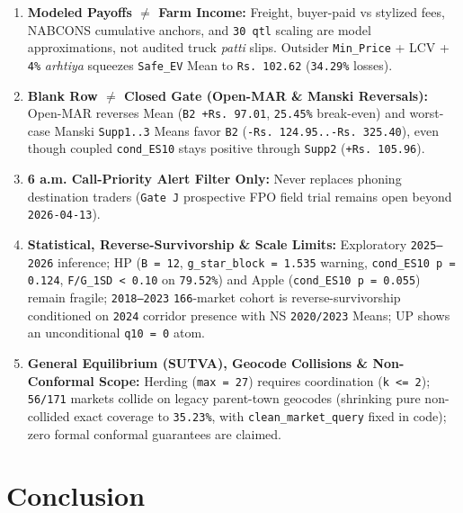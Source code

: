 \documentclass[11pt,a4paper]{article}
\begin{document}
\begin{enumerate}
  \item \textbf{Modeled Payoffs $\ne$ Farm Income:} Freight, buyer-paid vs stylized fees, NABCONS cumulative anchors, and \texttt{30 qtl} scaling are model approximations, not audited truck \textit{patti} slips. Outsider \texttt{Min\_Price} + LCV + \texttt{4\%} \textit{arhtiya} squeezes \texttt{Safe\_EV} Mean to \texttt{Rs.\,102.62} (\texttt{34.29\%} losses).
  \item \textbf{Blank Row $\ne$ Closed Gate (Open-MAR \& Manski Reversals):} Open-MAR reverses Mean (\texttt{B2 +Rs.\,97.01}, \texttt{25.45\%} break-even) and worst-case Manski \texttt{Supp1..3} Means favor \texttt{B2} (\texttt{-Rs.\,124.95..-Rs.\,325.40}), even though coupled \texttt{cond\_ES10} stays positive through \texttt{Supp2} (\texttt{+Rs.\,105.96}).
  \item \textbf{6 a.m. Call-Priority Alert Filter Only:} Never replaces phoning destination traders (\texttt{Gate J} prospective FPO field trial remains open beyond \texttt{2026-04-13}).
  \item \textbf{Statistical, Reverse-Survivorship \& Scale Limits:} Exploratory \texttt{2025--2026} inference; HP (\texttt{B = 12}, \texttt{g\_star\_block = 1.535} warning, \texttt{cond\_ES10 p = 0.124}, \texttt{F/G\_1SD < 0.10} on \texttt{79.52\%}) and Apple (\texttt{cond\_ES10 p = 0.055}) remain fragile; \texttt{2018--2023} \texttt{166}-market cohort is reverse-survivorship conditioned on \texttt{2024} corridor presence with NS \texttt{2020/2023} Means; UP shows an unconditional \texttt{q10 = 0} atom.
  \item \textbf{General Equilibrium (SUTVA), Geocode Collisions \& Non-Conformal Scope:} Herding (\texttt{max = 27}) requires coordination (\texttt{k <= 2}); \texttt{56/171} markets collide on legacy parent-town geocodes (shrinking pure non-collided exact coverage to \texttt{35.23\%}, with \texttt{clean\_market\_query} fixed in code); zero formal conformal guarantees are claimed.
\end{enumerate}

\section{Conclusion}
\end{document}

